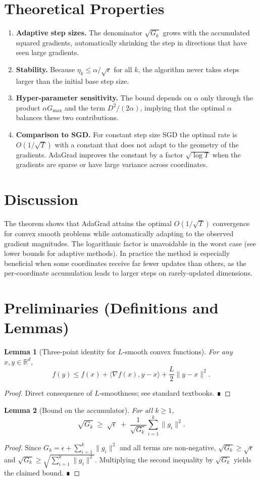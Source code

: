 \documentclass{article}
\newtheorem{lemma}{Lemma}
\newcommand{\R}{\mathbb{R}}
\begin{document}
\section*{Theoretical Properties}
\begin{enumerate}[label=\arabic*.]
\item \textbf{Adaptive step sizes.}  The denominator $\sqrt{G_k}$ grows with the accumulated squared gradients, automatically shrinking the step in directions that have seen large gradients.
\item \textbf{Stability.}  Because $\eta_k\le \alpha/\sqrt{\epsilon}$ for all $k$, the algorithm never takes steps larger than the initial base step size.
\item \textbf{Hyper‑parameter sensitivity.}  The bound depends on $\alpha$ only through the product $\alpha G_{\max}$ and the term $D^2/(2\alpha)$, implying that the optimal $\alpha$ balances these two contributions.
\item \textbf{Comparison to SGD.}  For constant step size SGD the optimal rate is $O(1/\sqrt{T})$ with a constant that does not adapt to the geometry of the gradients.  AdaGrad improves the constant by a factor $\sqrt{\log T}$ when the gradients are sparse or have large variance across coordinates.
\end{enumerate}

\section*{Discussion}
The theorem shows that AdaGrad attains the optimal $O(1/\sqrt{T})$ convergence for convex smooth problems while automatically adapting to the observed gradient magnitudes.  The logarithmic factor is unavoidable in the worst case (see lower bounds for adaptive methods).  In practice the method is especially beneficial when some coordinates receive far fewer updates than others, as the per‑coordinate accumulation leads to larger steps on rarely‑updated dimensions.

\section*{Preliminaries (Definitions and Lemmas)}
\begin{lemma}[Three‑point identity for $L$‑smooth convex functions]\label{lem:three}
For any $x,y\in\R^{d}$,
\[
f(y)\le f(x)+\langle\nabla f(x),y-x\rangle+\frac{L}{2}\|y-x\|^{2}.
\]
\end{lemma}
\begin{proof}
Direct consequence of $L$‑smoothness; see standard textbooks. ∎
\end{proof}
\begin{lemma}[Bound on the accumulator]\label{lem:acc}
For all $k\ge1$,
\[
\sqrt{G_k}\;\ge\;\sqrt{\epsilon}\;+\;\frac{1}{\sqrt{G_k}}\sum_{i=1}^{k} \|g_i\|^{2}.
\]
\end{lemma}
\begin{proof}
Since $G_k=\epsilon+\sum_{i=1}^{k}\|g_i\|^{2}$ and all terms are non‑negative,
$\sqrt{G_k}\ge \sqrt{\epsilon}$ and $\sqrt{G_k}\ge \sqrt{\sum_{i=1}^{k}\|g_i\|^{2}}$.
Multiplying the second inequality by $\sqrt{G_k}$ yields the claimed bound. ∎
\end{proof}
\end{document}
